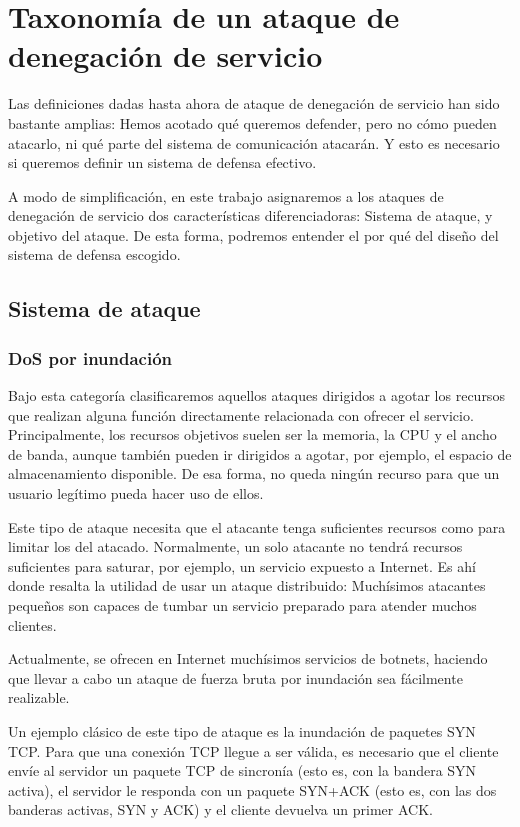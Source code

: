 \section{Taxonomía de un ataque de denegación de servicio}
Las definiciones dadas hasta ahora de ataque de denegación de servicio han sido bastante amplias: Hemos acotado qué 
queremos defender, pero no cómo pueden atacarlo, ni qué parte del sistema de comunicación atacarán. Y esto es necesario 
si queremos definir un sistema de defensa efectivo.

A modo de simplificación, en este trabajo asignaremos a los ataques de denegación de servicio dos características 
diferenciadoras: Sistema de ataque, y objetivo del ataque. De esta forma, podremos entender el por qué del diseño del 
sistema de defensa escogido.

\subsection{Sistema de ataque}
\subsubsection{DoS por inundación} 
Bajo esta categoría clasificaremos aquellos ataques dirigidos a agotar los recursos que realizan alguna función 
directamente relacionada con ofrecer el servicio. Principalmente, los recursos objetivos suelen ser la memoria, la CPU 
y el ancho de banda, aunque también pueden ir dirigidos a agotar, por ejemplo, el espacio de almacenamiento disponible. 
De esa forma, no queda ningún recurso para que un usuario legítimo pueda hacer uso de ellos.

Este tipo de ataque necesita que el atacante tenga suficientes recursos como para limitar los del atacado. Normalmente, 
un solo atacante no tendrá recursos suficientes para saturar, por ejemplo, un servicio expuesto a Internet. Es ahí 
donde resalta la utilidad de usar un ataque distribuido: Muchísimos atacantes pequeños son capaces de tumbar un 
servicio preparado para atender muchos clientes.

Actualmente, se ofrecen en Internet muchísimos servicios de botnets, haciendo que llevar a cabo un ataque de fuerza 
bruta por inundación sea fácilmente realizable.

Un ejemplo clásico de este tipo de ataque es la inundación de paquetes \gls{SYN} \gls{TCP}. Para que una 
conexión TCP llegue a ser válida, es necesario que el cliente envíe al servidor  un paquete \gls{TCP} de 
sincronía (esto es, con la bandera \gls{SYN} activa), el servidor le responda con un paquete \gls{SYN}+\gls{ACK} (esto es, con 
las dos banderas activas, \gls{SYN} y \gls{ACK}) y el cliente  devuelva un primer \gls{ACK}.

